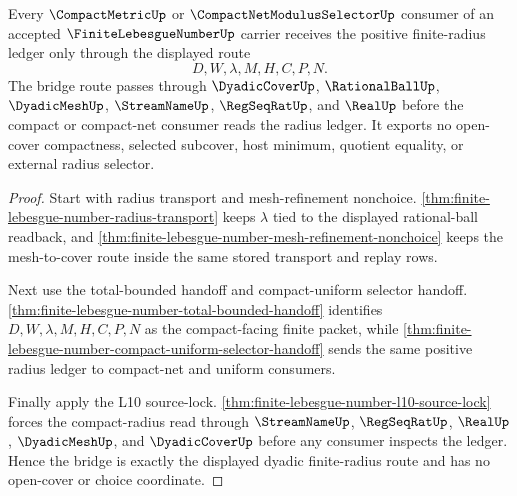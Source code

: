 \begin{theorem}
\label{thm:finite-lebesgue-number-compact-radius-bridge}
Every $\CompactMetricUp$ or $\CompactNetModulusSelectorUp$ consumer of an accepted $\FiniteLebesgueNumberUp$ carrier receives the positive finite-radius ledger only through the displayed route
$$
D,W,\lambda,M,H,C,P,N .
$$
The bridge route passes through $\DyadicCoverUp$, $\RationalBallUp$, $\DyadicMeshUp$, $\StreamNameUp$, $\RegSeqRatUp$, and $\RealUp$ before the compact or compact-net consumer reads the radius ledger. It exports no open-cover compactness, selected subcover, host minimum, quotient equality, or external radius selector.
\end{theorem}
\begin{proof}
Start with radius transport and mesh-refinement nonchoice. \autoref{thm:finite-lebesgue-number-radius-transport} keeps $\lambda$ tied to the displayed rational-ball readback, and \autoref{thm:finite-lebesgue-number-mesh-refinement-nonchoice} keeps the mesh-to-cover route inside the same stored transport and replay rows.

Next use the total-bounded handoff and compact-uniform selector handoff. \autoref{thm:finite-lebesgue-number-total-bounded-handoff} identifies $D,W,\lambda,M,H,C,P,N$ as the compact-facing finite packet, while \autoref{thm:finite-lebesgue-number-compact-uniform-selector-handoff} sends the same positive radius ledger to compact-net and uniform consumers.

Finally apply the L10 source-lock. \autoref{thm:finite-lebesgue-number-l10-source-lock} forces the compact-radius read through $\StreamNameUp$, $\RegSeqRatUp$, $\RealUp$, $\DyadicMeshUp$, and $\DyadicCoverUp$ before any consumer inspects the ledger. Hence the bridge is exactly the displayed dyadic finite-radius route and has no open-cover or choice coordinate.
\end{proof}

